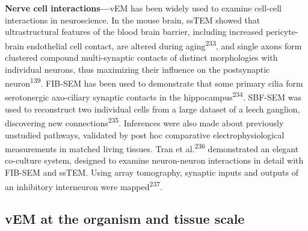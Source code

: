 \documentclass{article}
\begin{document}
\textbf{Nerve cell interactions—}vEM has been widely used to examine cell-cell interactions in neuroscience. In the mouse brain, ssTEM showed that ultrastructural features of the blood brain barrier, including increased pericyte-brain endothelial cell contact, are altered during aging\textsuperscript{233}, and single axons form clustered compound multi-synaptic contacts of distinct morphologies with individual neurons, thus maximizing their influence on the postsynaptic neuron\textsuperscript{139}. FIB-SEM has been used to demonstrate that some primary cilia form serotonergic axo-ciliary synaptic contacts in the hippocampus\textsuperscript{234}. SBF-SEM was used to reconstruct two individual cells from a large dataset of a leech ganglion, discovering new connections\textsuperscript{235}. Inferences were also made about previously unstudied pathways, validated by post hoc comparative electrophysiological measurements in matched living tissues. Tran et al.\textsuperscript{236} demonstrated an elegant co-culture system, designed to examine neuron-neuron interactions in detail with FIB-SEM and ssTEM. Using array tomography, synaptic inputs and outputs of an inhibitory interneuron were mapped\textsuperscript{237}.

\subsection*{vEM at the organism and tissue scale}
\end{document}
